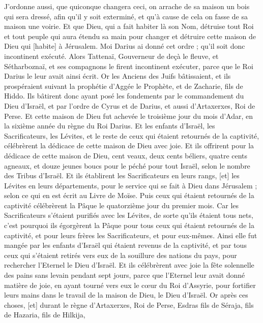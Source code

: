 \begin{multicols}{2}
J'ordonne aussi, que quiconque changera ceci, on arrache de sa maison un bois qui sera dressé, afin qu'il y soit exterminé, et qu'à cause de cela on fasse de sa maison une voirie.
Et que Dieu, qui a fait habiter là son Nom, détruise tout Roi et tout peuple qui aura étendu sa main pour changer et détruire cette maison de Dieu qui [habite] à Jérusalem. Moi Darius ai donné cet ordre ; qu'il soit donc incontinent exécuté.
Alors Tattenaï, Gouverneur de deçà le fleuve, et Sétharboznaï, et ses compagnons le firent incontinent exécuter, parce que le Roi Darius le leur avait ainsi écrit.
Or les Anciens des Juifs bâtissaient, et ils prospéraient suivant la prophétie d'Aggée le Prophète, et de Zacharie, fils de Hiddo. Ils bâtirent donc ayant posé les fondements par le commandement du Dieu d'Israël, et par l'ordre de Cyrus et de Darius, et aussi d'Artaxerxes, Roi de Perse.
Et cette maison de Dieu fut achevée le troisième jour du mois d'Adar, en la sixième année du règne du Roi Darius.
Et les enfants d'Israël, les Sacrificateurs, les Lévites, et le reste de ceux qui étaient retournés de la captivité, célébrèrent la dédicace de cette maison de Dieu avec joie.
Et ils offrirent pour la dédicace de cette maison de Dieu, cent veaux, deux cents béliers, quatre cents agneaux, et douze jeunes boucs pour le péché pour tout Israël, selon le nombre des Tribus d'Israël.
Et ils établirent les Sacrificateurs en leurs rangs, [et] les Lévites en leurs départements, pour le service qui se fait à Dieu dans Jérusalem ; selon ce qui en est écrit au Livre de Moïse.
Puis ceux qui étaient retournés de la captivité célébrèrent la Pâque le quatorzième jour du premier mois.
Car les Sacrificateurs s'étaient purifiés avec les Lévites, de sorte qu'ils étaient tous nets, c'est pourquoi ils égorgèrent la Pâque pour tous ceux qui étaient retournés de la captivité, et pour leurs frères les Sacrificateurs, et pour eux-mêmes.
Ainsi elle fut mangée par les enfants d'Israël qui étaient revenus de la captivité, et par tous ceux qui s'étaient retirés vers eux de la souillure des nations du pays, pour rechercher l'Eternel le Dieu d'Israël.
Et ils célébrèrent avec joie la fête solennelle des pains sans levain pendant sept jours, parce que l'Eternel leur avait donné matière de joie, en ayant tourné vers eux le cœur du Roi d'Assyrie, pour fortifier leurs mains dans le travail de la maison de Dieu, le Dieu d'Israël.
\VerseOne{}Or après ces choses, [et] durant le règne d'Artaxerxes, Roi de Perse, Esdras fils de Séraja, fils de Hazaria, fils de Hilkija,

\end{multicols}
